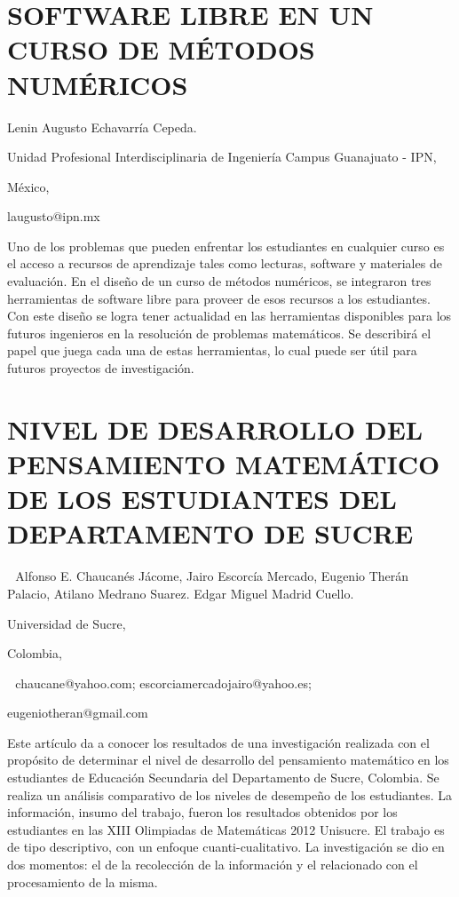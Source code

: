 \section{SOFTWARE LIBRE EN UN CURSO DE MÉTODOS NUMÉRICOS }

\begin{datos}

Lenin Augusto Echavarría Cepeda.

Unidad Profesional Interdisciplinaria de Ingeniería Campus Guanajuato
- IPN, 

México,

laugusto@ipn.mx 

\end{datos}

Uno de los problemas que pueden enfrentar los estudiantes en cualquier
curso es el acceso a recursos de aprendizaje tales como lecturas,
software y materiales de evaluación. En el diseño de un curso de métodos
numéricos, se integraron tres herramientas de software libre para
proveer de esos recursos a los estudiantes. Con este diseño se logra
tener actualidad en las herramientas disponibles para los futuros
ingenieros en la resolución de problemas matemáticos. Se describirá
el papel que juega cada una de estas herramientas, lo cual puede ser
útil para futuros proyectos de investigación.


\section{NIVEL DE DESARROLLO DEL PENSAMIENTO MATEMÁTICO DE LOS ESTUDIANTES
DEL DEPARTAMENTO DE SUCRE}

\begin{datos}

  Alfonso E. Chaucanés Jácome, Jairo Escorcía Mercado, Eugenio Therán
Palacio, Atilano Medrano Suarez. Edgar Miguel Madrid Cuello.

Universidad de Sucre,

Colombia,

  chaucane@yahoo.com; escorciamercadojairo@yahoo.es;

eugeniotheran@gmail.com 

\end{datos}

Este artículo da a conocer los resultados de una investigación realizada
con el propósito de determinar el nivel de desarrollo del pensamiento
matemático en los estudiantes de Educación Secundaria del Departamento
de Sucre, Colombia. Se realiza un análisis comparativo de los niveles
de desempeño de los estudiantes. La información, insumo del trabajo,
fueron los resultados obtenidos por los estudiantes en las XIII Olimpiadas
de Matemáticas 2012 Unisucre. El trabajo es de tipo descriptivo, con
un enfoque cuanti-cualitativo. La investigación se dio en dos momentos:
el de la recolección de la información y el relacionado con el procesamiento
de la misma.

